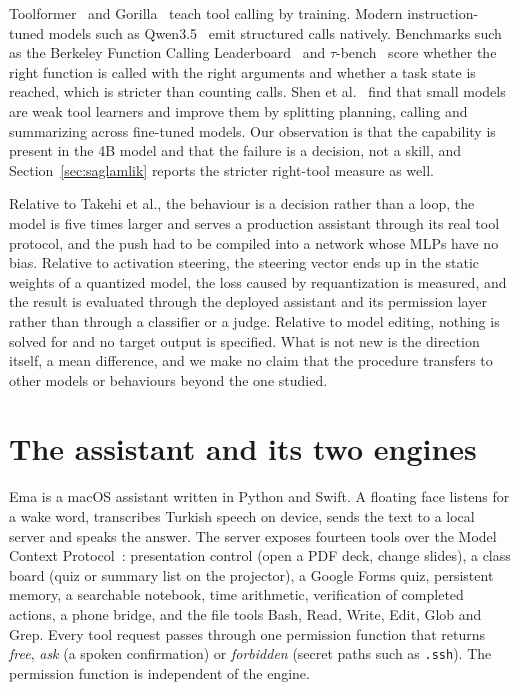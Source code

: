\documentclass[11pt]{article}
\begin{document}
Toolformer~\citep{schick2023toolformer} and Gorilla~\citep{patil2024gorilla} teach tool calling by training. Modern instruction-tuned models such as Qwen3.5~\citep{qwen35} emit structured calls natively. Benchmarks such as the Berkeley Function Calling Leaderboard~\citep{patil2025bfcl} and $\tau$-bench~\citep{yao2024taubench} score whether the right function is called with the right arguments and whether a task state is reached, which is stricter than counting calls. Shen et al.~\citep{shen2024small} find that small models are weak tool learners and improve them by splitting planning, calling and summarizing across fine-tuned models. Our observation is that the capability is present in the 4B model and that the failure is a decision, not a skill, and Section~\ref{sec:saglamlik} reports the stricter right-tool measure as well.

Relative to Takehi et al., the behaviour is a decision rather than a loop, the model is five times larger and serves a production assistant through its real tool protocol, and the push had to be compiled into a network whose MLPs have no bias. Relative to activation steering, the steering vector ends up in the static weights of a quantized model, the loss caused by requantization is measured, and the result is evaluated through the deployed assistant and its permission layer rather than through a classifier or a judge. Relative to model editing, nothing is solved for and no target output is specified. What is not new is the direction itself, a mean difference, and we make no claim that the procedure transfers to other models or behaviours beyond the one studied.

\section{The assistant and its two engines}
\label{sec:system}

Ema is a macOS assistant written in Python and Swift. A floating face listens for a wake word, transcribes Turkish speech on device, sends the text to a local server and speaks the answer. The server exposes fourteen tools over the Model Context Protocol~\citep{mcp2024}: presentation control (open a PDF deck, change slides), a class board (quiz or summary list on the projector), a Google Forms quiz, persistent memory, a searchable notebook, time arithmetic, verification of completed actions, a phone bridge, and the file tools Bash, Read, Write, Edit, Glob and Grep. Every tool request passes through one permission function that returns \emph{free}, \emph{ask} (a spoken confirmation) or \emph{forbidden} (secret paths such as \texttt{.ssh}). The permission function is independent of the engine.
\end{document}
